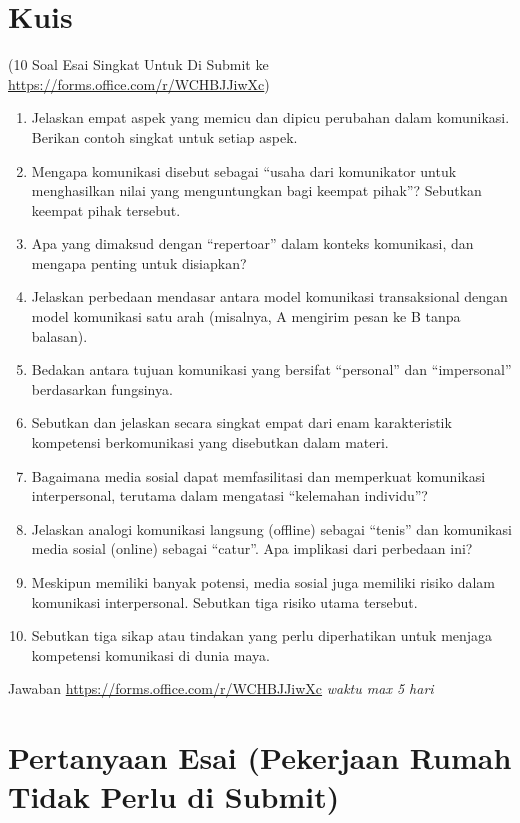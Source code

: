 \documentclass[
  letterpaper,
  DIV=11,
  numbers=noendperiod]{scrreprt}
\providecommand{\tightlist}{%
  \setlength{\itemsep}{0pt}\setlength{\parskip}{0pt}}
\begin{document}
\section{Kuis}\label{kuis}

(10 Soal Esai Singkat Untuk Di Submit ke
\url{https://forms.office.com/r/WCHBJJiwXc})

\begin{enumerate}
\def\labelenumi{\arabic{enumi}.}
\tightlist
\item
  Jelaskan empat aspek yang memicu dan dipicu perubahan dalam
  komunikasi. Berikan contoh singkat untuk setiap aspek.
\item
  Mengapa komunikasi disebut sebagai ``usaha dari komunikator untuk
  menghasilkan nilai yang menguntungkan bagi keempat pihak''? Sebutkan
  keempat pihak tersebut.
\item
  Apa yang dimaksud dengan ``repertoar'' dalam konteks komunikasi, dan
  mengapa penting untuk disiapkan?
\item
  Jelaskan perbedaan mendasar antara model komunikasi transaksional
  dengan model komunikasi satu arah (misalnya, A mengirim pesan ke B
  tanpa balasan).
\item
  Bedakan antara tujuan komunikasi yang bersifat ``personal'' dan
  ``impersonal'' berdasarkan fungsinya.
\item
  Sebutkan dan jelaskan secara singkat empat dari enam karakteristik
  kompetensi berkomunikasi yang disebutkan dalam materi.
\item
  Bagaimana media sosial dapat memfasilitasi dan memperkuat komunikasi
  interpersonal, terutama dalam mengatasi ``kelemahan individu''?
\item
  Jelaskan analogi komunikasi langsung (offline) sebagai ``tenis'' dan
  komunikasi media sosial (online) sebagai ``catur''. Apa implikasi dari
  perbedaan ini?
\item
  Meskipun memiliki banyak potensi, media sosial juga memiliki risiko
  dalam komunikasi interpersonal. Sebutkan tiga risiko utama tersebut.
\item
  Sebutkan tiga sikap atau tindakan yang perlu diperhatikan untuk
  menjaga kompetensi komunikasi di dunia maya.
\end{enumerate}

Jawaban \url{https://forms.office.com/r/WCHBJJiwXc} \emph{waktu max 5
hari}

\section{Pertanyaan Esai (Pekerjaan Rumah Tidak Perlu di
Submit)}\label{pertanyaan-esai-pekerjaan-rumah-tidak-perlu-di-submit}
\end{document}
